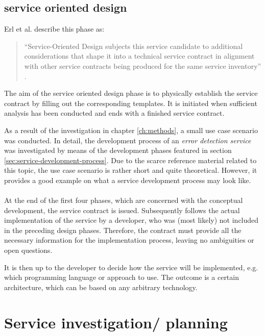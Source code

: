 \subsection{service oriented design}

Erl et al. describe this phase as:
\begin{quote}
``Service-Oriented Design subjects this service candidate to additional considerations that shape it into a technical service contract in alignment with other service contracts being produced for the same service inventory'' \cite[p.86]{erl2011}.
\end{quote}


The aim of the service oriented design phase is to physically establish the service contract by filling out the corresponding templates. It is initiated when sufficient analysis has been conducted and ends with a finished service contract.















As a result of the investigation in chapter \ref{ch:methods}, a small use case scenario was conducted. In detail, the development process of an \emph{error detection service} was investigated by means of the development phases featured in section \ref{sec:service-development-process}. Due to the scarce reference material related to this topic, the use case scenario is rather short and quite theoretical. However, it provides a good example on what a service development process may look like.
\\
\\
At the end of the first four phases, which are concerned with the conceptual development, the service contract is issued. Subsequently follows the actual implementation of the service by a developer, who was (most likely) not included in the preceding design phases. Therefore, the contract must provide all the necessary information for the implementation process, leaving no ambiguities or open questions.

It is then up to the developer to decide how the service will be implemented, e.g. which programming language or approach to use. The outcome is a certain architecture, which can be based on any arbitrary technology. 



\section{Service investigation/ planning}


